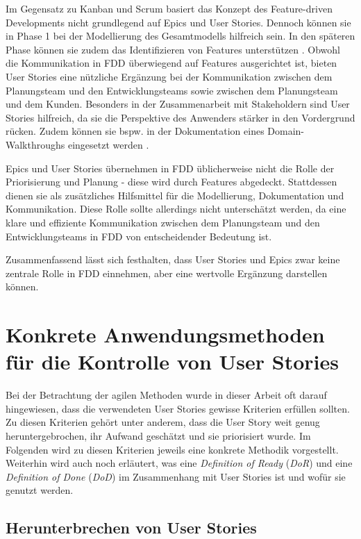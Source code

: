 \documentclass[acmtog]{acmart}
\begin{document}
Im Gegensatz zu Kanban und Scrum basiert das Konzept des Feature-driven Developments nicht grundlegend auf Epics und User Stories.
Dennoch können sie in Phase 1 bei der Modellierung des Gesamtmodells hilfreich sein.
In den späteren Phase können sie zudem das Identifizieren von Features unterstützen \cite{hunt06}.
Obwohl die Kommunikation in FDD überwiegend auf Features ausgerichtet ist, bieten User Stories eine nützliche Ergänzung bei der Kommunikation zwischen dem Planungsteam und den Entwicklungsteams sowie zwischen dem Planungsteam und dem Kunden.
Besonders in der Zusammenarbeit mit Stakeholdern sind User Stories hilfreich, da sie die Perspektive des Anwenders stärker in den Vordergrund rücken.
Zudem können sie bspw. in der Dokumentation eines Domain-Walkthroughs eingesetzt werden \cite{palmer02}.

Epics und User Stories übernehmen in FDD üblicherweise nicht die Rolle der Priorisierung und Planung - diese wird durch Features abgedeckt. Stattdessen dienen sie als zusätzliches Hilfsmittel für die Modellierung, Dokumentation und Kommunikation. Diese Rolle sollte allerdings nicht unterschätzt werden, da eine klare und effiziente Kommunikation zwischen dem Planungsteam und den Entwicklungsteams in FDD von entscheidender Bedeutung ist.

Zusammenfassend lässt sich festhalten, dass User Stories und Epics zwar keine zentrale Rolle in FDD einnehmen, aber eine wertvolle Ergänzung darstellen können.

\section{Konkrete Anwendungsmethoden für die Kontrolle von User Stories}

Bei der Betrachtung der agilen Methoden wurde in dieser Arbeit oft darauf hingewiesen, dass die verwendeten User Stories gewisse Kriterien 
erfüllen sollten. Zu diesen Kriterien gehört unter anderem, dass die User Story weit genug heruntergebrochen, ihr Aufwand geschätzt und sie priorisiert 
wurde. Im Folgenden wird zu diesen Kriterien jeweils eine konkrete Methodik vorgestellt. Weiterhin wird auch noch erläutert, was eine \emph{Definition of 
Ready} (\emph{DoR}) und eine \emph{Definition of Done} (\emph{DoD}) im Zusammenhang mit User Stories ist und wofür sie genutzt werden.

\subsection{Herunterbrechen von User Stories} \label{sec:breakedown}
\end{document}
